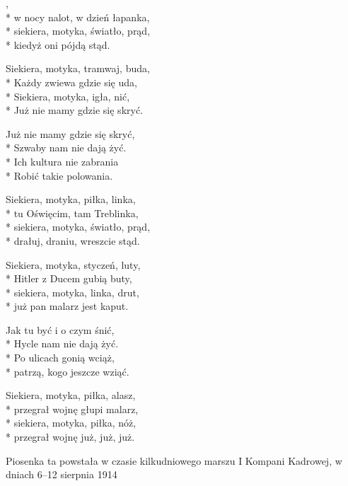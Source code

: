 \begin{lyrics}[longestline={Siekiera, motyka, bimber, szklanka,}]

,\\*
w nocy nalot, w dzień łapanka,\\*
siekiera, motyka, światło, prąd,\\*
kiedyż oni pójdą stąd.

Siekiera, motyka, tramwaj, buda,\\*
Każdy zwiewa gdzie się uda,\\*
Siekiera, motyka, igła, nić,\\*
Już nie mamy gdzie się skryć.

\vin Już nie mamy gdzie się skryć,\\*
\vin Szwaby nam nie dają żyć.\\*
\vin Ich kultura nie zabrania\\*
\vin Robić takie polowania.

Siekiera, motyka, piłka, linka,\\*
tu Oświęcim, tam Treblinka,\\*
siekiera, motyka, światło, prąd,\\*
drałuj, draniu, wreszcie stąd.

Siekiera, motyka, styczeń, luty,\\*
Hitler z Ducem gubią buty,\\*
siekiera, motyka, linka, drut,\\*
już pan malarz jest kaput.

\vin Jak tu być i o czym śnić,\\*
\vin Hycle nam nie dają żyć.\\*
\vin Po ulicach gonią wciąż,\\*
\vin patrzą, kogo jeszcze wziąć.

Siekiera, motyka, piłka, alasz,\\*
przegrał wojnę głupi malarz,\\*
siekiera, motyka, piłka, nóż,\\*
przegrał wojnę już, już, już.
\end{lyrics}



\begin{info}Piosenka ta powstała w czasie kilkudniowego marszu I Kompani Kadrowej, w dniach 6–12 sierpnia 1914\end{info}

